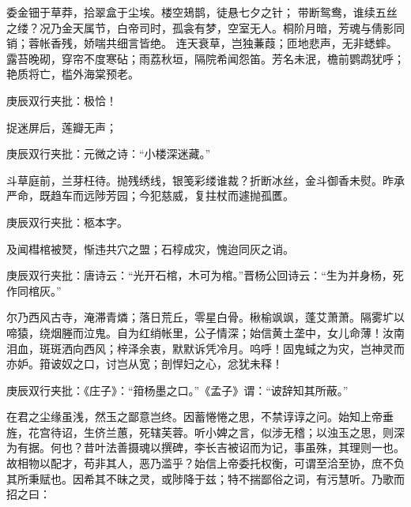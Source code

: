 \begin{parag}
    委金钿于草莽，拾翠盒于尘埃。楼空鳷鹊，徒悬七夕之针；
    带断鸳鸯，谁续五丝之缕？况乃金天属节，白帝司时，孤衾有梦，空室无人。桐阶月暗，芳魂与倩影同销；蓉帐香残，娇喘共细言皆绝。
    连天衰草，岂独蒹葭；匝地悲声，无非蟋蟀。
    露苔晚砌，穿帘不度寒砧；雨荔秋垣，隔院希闻怨笛。芳名未泯，檐前鹦鹉犹呼；艳质将亡，槛外海棠预老。
    \begin{note}庚辰双行夹批：极恰！\end{note}捉迷屏后，莲瓣无声；\begin{note}庚辰双行夹批：元微之诗：“小楼深迷藏。”\end{note}斗草庭前，兰芽枉待。抛残绣线，银笺彩缕谁裁？折断冰丝，金斗御香未熨。昨承严命，既趋车而远陟芳园；今犯慈威，复拄杖而遽抛孤匶。\begin{note}庚辰双行夹批：柩本字。\end{note}及闻槥棺被燹，惭违共穴之盟；石椁成灾，愧迨同灰之诮。\begin{note}庚辰双行夹批：唐诗云：“光开石棺，木可为棺。”晋杨公回诗云：“生为并身杨，死作同棺灰。”\end{note}尔乃西风古寺，淹滞青燐；落日荒丘，零星白骨。楸榆飒飒，蓬艾萧萧。隔雾圹以啼猿，绕烟塍而泣鬼。自为红绡帐里，公子情深；始信黄土垄中，女儿命薄！汝南泪血，斑斑洒向西风；梓泽余衷，默默诉凭冷月。呜呼！固鬼蜮之为灾，岂神灵而亦妒。箝诐奴之口，讨岂从宽；剖悍妇之心，忿犹未释！\begin{note}庚辰双行夹批：《庄子》：“箝杨墨之口。”《孟子》谓：“诐辞知其所蔽。”\end{note}在君之尘缘虽浅，然玉之鄙意岂终。因蓄惓惓之思，不禁谆谆之问。始知上帝垂旌，花宫待诏，生侪兰蕙，死辖芙蓉。听小婢之言，似涉无稽；以浊玉之思，则深为有据。何也？昔叶法善摄魂以撰碑，李长吉被诏而为记，事虽殊，其理则一也。故相物以配才，苟非其人，恶乃滥乎？始信上帝委托权衡，可谓至洽至协，庶不负其所秉赋也。因希其不昧之灵，或陟降于兹；特不揣鄙俗之词，有污慧听。乃歌而招之曰：
\end{parag}
